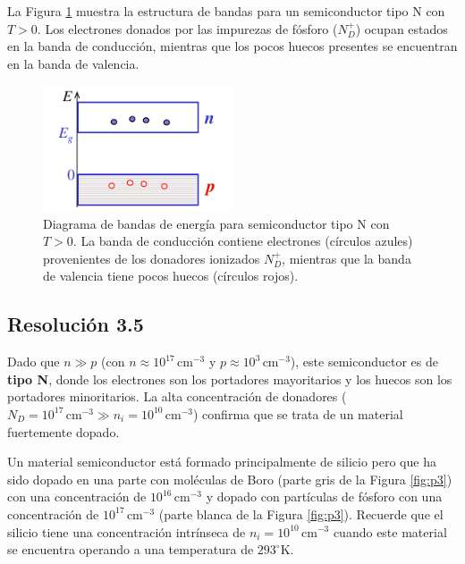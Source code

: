 \documentclass[
  11pt,
  letterpaper,
   addpoints,
   answers
  ]{exam}
\begin{document}
\begin{questions}
\begin{solution}
    La Figura \ref{fig:tipo_n} muestra la estructura de bandas para un semiconductor tipo N con $T > 0$. Los electrones donados por las impurezas de fósforo ($N_D^+$) ocupan estados en la banda de conducción, mientras que los pocos huecos presentes se encuentran en la banda de valencia.

    \begin{figure}[H]
        \centering
        \includegraphics[width=0.5\textwidth]{../figures/Auxiliar_2_6}
        \caption{Diagrama de bandas de energía para semiconductor tipo N con $T > 0$. La banda de conducción contiene electrones (círculos azules) provenientes de los donadores ionizados $N_D^+$, mientras que la banda de valencia tiene pocos huecos (círculos rojos).}
        \label{fig:tipo_n}
    \end{figure}

\subsection*{Resolución 3.5}

    Dado que $n \gg p$ (con $n \approx 10^{17}\,\mathrm{cm^{-3}}$ y $p \approx 10^{3}\,\mathrm{cm^{-3}}$), este semiconductor es de \textbf{tipo N}, donde los electrones son los portadores mayoritarios y los huecos son los portadores minoritarios. La alta concentración de donadores ($N_D = 10^{17}\,\mathrm{cm^{-3}} \gg n_i = 10^{10}\,\mathrm{cm^{-3}}$) confirma que se trata de un material fuertemente dopado.
\end{solution}
\question
Un material semiconductor está formado principalmente de silicio pero que ha sido dopado en una parte con moléculas de Boro (parte gris de la Figura \ref{fig:p3}) con una concentración de $10^{16}\,\text{cm}^{-3}$ y dopado con partículas de fósforo con una concentración de $10^{17}\,\text{cm}^{-3}$ (parte blanca de la Figura \ref{fig:p3}). Recuerde que el silicio tiene una concentración intrínseca de $n_i = 10^{10}\,\text{cm}^{-3}$ cuando este material se encuentra operando a una temperatura de $293^\circ \text{K}$.


\end{questions}
\end{document}
